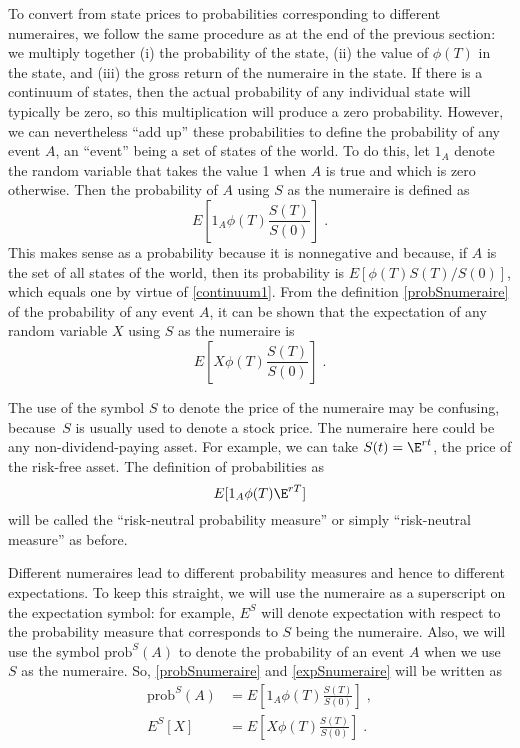 To convert from state prices to probabilities corresponding to different numeraires, we follow the same procedure as at the end of the previous section: we multiply together (i) the probability of the state, (ii) the value of $\phi(T)$ in the state, and (iii)  the gross return of the numeraire in the state.  If there is a continuum of states, then the actual probability of any individual state will typically be zero, so this multiplication will produce a zero probability.  However, we can nevertheless ``add up'' these probabilities to define the probability of any event $A$, an ``event'' being a set of states of the world.  To do this, let $1_A$ denote the random variable that takes the value 1 when $A$ is true and which is zero otherwise.  Then the probability of $A$ using $S$ as the numeraire is defined as  
\begin{equation}\label{probSnumeraire}
E\left[1_A\phi(T)\frac{S(T)}{S(0)}\right]\;.
\end{equation}
This makes sense as a probability because it is nonnegative and because, if $A$ is the set of all states of the world, then its probability is  $E[\phi(T)S(T)/S(0)]$, which equals one by virtue of \eqref{continuum1}.  From the definition \eqref{probSnumeraire} of the probability of any event $A$, it can be shown that the expectation of any random variable $X$ using $S$ as the numeraire is
\begin{equation}\label{expSnumeraire}
E\left[X\phi(T)\frac{S(T)}{S(0)}\right]\;.
\end{equation}

The use of the symbol $S$ to denote the price of the numeraire may be confusing, because~$S$ is usually used to denote a stock price.  The numeraire here could be any non-dividend-paying asset.  For example, we can take $S(t)=\E^{rt}$, the price of the risk-free asset.  The definition of probabilities as
\begin{equation}\label{riskneutralprob00}
E[1_A\phi(T)\E^{rT}]
\end{equation}
will be called the ``risk-neutral probability measure'' or simply ``risk-neutral measure'' as before.  

Different numeraires lead to different probability measures and hence to different expectations.  To keep this straight, we will use the numeraire as a superscript on the expectation symbol: for example, $E^S$ will denote expectation with respect to the probability measure that corresponds to $S$ being the numeraire.  Also, we will use the symbol $\text{prob}^S(A)$ to denote the probability of an event $A$ when we use $S$ as the numeraire.  So, \eqref{probSnumeraire} and \eqref{expSnumeraire} will be written as 
\begin{align}
\text{prob}^S(A) &= E\left[1_A\phi(T)\frac{S(T)}{S(0)}\right]\;,\label{probSnumeraire2}\\
\label{expSnumeraire2}
E^S[X] &= E\left[X\phi(T)\frac{S(T)}{S(0)}\right]\;.
\end{align}

